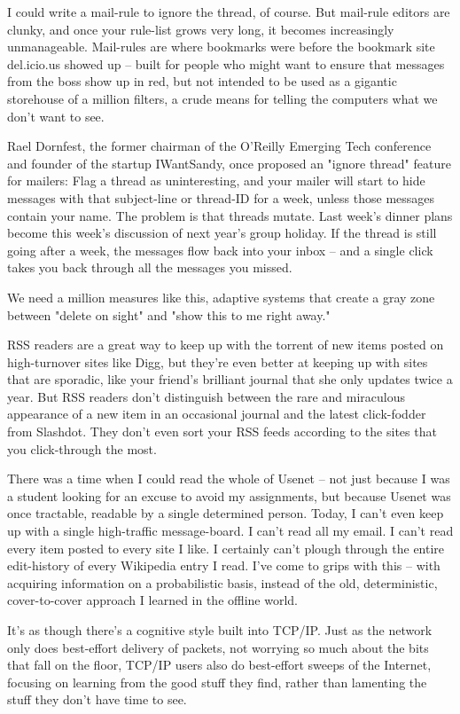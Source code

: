 I could write a mail-rule to ignore the thread, of course. But
mail-rule editors are clunky, and once your rule-list grows very
long, it becomes increasingly unmanageable. Mail-rules are where
bookmarks were before the bookmark site del.icio.us showed up --
built for people who might want to ensure that messages from the
boss show up in red, but not intended to be used as a gigantic
storehouse of a million filters, a crude means for telling the
computers what we don't want to see.

Rael Dornfest, the former chairman of the O'Reilly Emerging Tech
conference and founder of the startup IWantSandy, once proposed an
"ignore thread" feature for mailers: Flag a thread as
uninteresting, and your mailer will start to hide messages with
that subject-line or thread-ID for a week, unless those messages
contain your name. The problem is that threads mutate. Last week's
dinner plans become this week's discussion of next year's group
holiday. If the thread is still going after a week, the messages
flow back into your inbox -- and a single click takes you back
through all the messages you missed.

We need a million measures like this, adaptive systems that create
a gray zone between "delete on sight" and "show this to me right
away."

RSS readers are a great way to keep up with the torrent of new
items posted on high-turnover sites like Digg, but they're even
better at keeping up with sites that are sporadic, like your
friend's brilliant journal that she only updates twice a year. But
RSS readers don't distinguish between the rare and miraculous
appearance of a new item in an occasional journal and the latest
click-fodder from Slashdot. They don't even sort your RSS feeds
according to the sites that you click-through the most.

There was a time when I could read the whole of Usenet -- not just
because I was a student looking for an excuse to avoid my
assignments, but because Usenet was once tractable, readable by a
single determined person. Today, I can't even keep up with a single
high-traffic message-board. I can't read all my email. I can't read
every item posted to every site I like. I certainly can't plough
through the entire edit-history of every Wikipedia entry I read.
I've come to grips with this -- with acquiring information on a
probabilistic basis, instead of the old, deterministic,
cover-to-cover approach I learned in the offline world.

It's as though there's a cognitive style built into TCP/IP. Just as
the network only does best-effort delivery of packets, not worrying
so much about the bits that fall on the floor, TCP/IP users also do
best-effort sweeps of the Internet, focusing on learning from the
good stuff they find, rather than lamenting the stuff they don't
have time to see.


